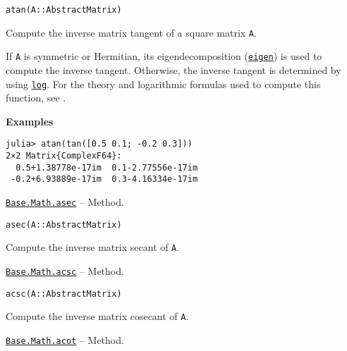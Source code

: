 \begin{adjustwidth}{2em}{0pt}


\begin{verbatim}
atan(A::AbstractMatrix)
\end{verbatim}

Compute the inverse matrix tangent of a square matrix \texttt{A}.

If \texttt{A} is symmetric or Hermitian, its eigendecomposition (\hyperlink{11056016707394839114}{\texttt{eigen}}) is used to compute the inverse tangent. Otherwise, the inverse tangent is determined by using \hyperlink{17317607370922767936}{\texttt{log}}.  For the theory and logarithmic formulas used to compute this function, see \footnotemark[14].

\textbf{Examples}


\begin{verbatim}
julia> atan(tan([0.5 0.1; -0.2 0.3]))
2×2 Matrix{ComplexF64}:
  0.5+1.38778e-17im  0.1-2.77556e-17im
 -0.2+6.93889e-17im  0.3-4.16334e-17im
\end{verbatim}



\end{adjustwidth}
\hypertarget{4142713817945993571}{}
\hyperlink{4142713817945993571}{\texttt{Base.Math.asec}}  -- {Method.}

\begin{adjustwidth}{2em}{0pt}


\begin{verbatim}
asec(A::AbstractMatrix)
\end{verbatim}

Compute the inverse matrix secant of \texttt{A}.



\end{adjustwidth}
\hypertarget{7785015360987711230}{}
\hyperlink{7785015360987711230}{\texttt{Base.Math.acsc}}  -- {Method.}

\begin{adjustwidth}{2em}{0pt}


\begin{verbatim}
acsc(A::AbstractMatrix)
\end{verbatim}

Compute the inverse matrix cosecant of \texttt{A}.



\end{adjustwidth}
\hypertarget{16933348399497749917}{}
\hyperlink{16933348399497749917}{\texttt{Base.Math.acot}}  -- {Method.}

